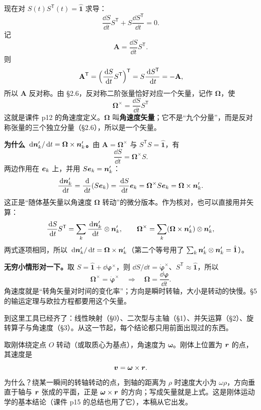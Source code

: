 \documentclass[11pt]{ctexart}
\newcommand{\ten}[1]{\mathbf{#1}}
\newcommand{\unitd}{\hat{\ten{1}}}
\let\orighdr\hdr
\renewcommand{\hdr}[2]{\par\needspace{5\baselineskip}\orighdr{#1}{#2}}
\let\origsubhdr\subhdr
\renewcommand{\subhdr}[1]{\par\needspace{3\baselineskip}\origsubhdr{#1}}
\begin{document}
现在对 $S(t)S^{\mathsf T}(t)=\unitd$ 求导：
\[
\frac{\dd S}{\dd t}S^{\mathsf T}+S\frac{\dd S^{\mathsf T}}{\dd t}=0 .
\]
记
\[
\ten A=\frac{\dd S}{\dd t}S^{\mathsf T}.
\]
则
\[
\ten A^{\mathsf T}=\Bigl(\frac{\dd S}{\dd t}S^{\mathsf T}\Bigr)^{\mathsf T}
=S\frac{\dd S^{\mathsf T}}{\dd t}=-\ten A,
\]
所以 $\ten A$ 反对称。由 §2.6，反对称二阶张量恰好对应一个矢量，记作 $\boldsymbol\Omega$，使
\[
\boxed{\;\boldsymbol\Omega^{\times}=\frac{\dd S}{\dd t}S^{\mathsf T}\;}
\]
这就是课件 p12 的角速度定义。$\boldsymbol\Omega$ 叫\textbf{角速度矢量}；它不是“九个分量”，而是反对称张量的三个独立分量（§2.6），所以是一个矢量。

\textbf{为什么 $\,\mathrm{d}\boldsymbol{n}'_k/\,\mathrm{d} t=\boldsymbol\Omega\times\boldsymbol{n}'_k$。}由 $\ten A=\boldsymbol\Omega^{\times}$ 与 $S^{\mathsf T}S=\unitd$，有
\[
\frac{\dd S}{\dd t}=\boldsymbol\Omega^{\times}S .
\]
两边作用在 $\boldsymbol{e}_k$ 上，并用 $S\boldsymbol{e}_k=\boldsymbol{n}'_k$：
\[
\frac{\,\mathrm{d}\boldsymbol{n}'_k}{\,\mathrm{d} t}=\frac{\,\mathrm{d}}{\,\mathrm{d} t}(S\boldsymbol{e}_k)=\frac{\,\mathrm{d} S}{\,\mathrm{d} t}\boldsymbol{e}_k=\boldsymbol\Omega^{\times}S\boldsymbol{e}_k=\boldsymbol\Omega\times\boldsymbol{n}'_k .
\]
这正是“随体基矢量以角速度 $\boldsymbol\Omega$ 转动”的微分版本。作为核对，也可以直接用并矢算：
\[
\frac{\,\mathrm{d} S}{\,\mathrm{d} t}S^{\mathsf T}
=\sum_k\frac{\,\mathrm{d}\boldsymbol{n}'_k}{\,\mathrm{d} t}\otimes\boldsymbol{n}'_k,
\qquad
\boldsymbol\Omega^{\times}=\sum_k(\boldsymbol\Omega\times\boldsymbol{n}'_k)\otimes\boldsymbol{n}'_k,
\]
两式逐项相同，所以 $\,\mathrm{d}\boldsymbol{n}'_k/\,\mathrm{d} t=\boldsymbol\Omega\times\boldsymbol{n}'_k$（第二个等号用了 $\sum_k\vect n'_k\otimes\vect n'_k=\unitd$）。

\textbf{无穷小情形对一下。}取 $S=\unitd+\dd{\boldsymbol\varphi}^{\times}$，则 $\dd S/\dd t=\dot{\boldsymbol\varphi}^{\times}$、$S^{\mathsf T}\approx\unitd$，所以
\[
\boldsymbol\Omega^{\times}=\dot{\boldsymbol\varphi}^{\times}
\quad\Longrightarrow\quad
\boldsymbol\Omega=\frac{\dd{\boldsymbol\varphi}}{\dd t}.
\]
角速度就是“转角矢量对时间的变化率”；方向是瞬时转轴，大小是转动的快慢。§5 的输运定理与欧拉方程都要用这个矢量。


到这里工具已经齐了：线性映射（§0）、二次型与主轴（§1）、并矢运算（§2）、旋转算子与角速度（§3）。从这一节起，每个结论都只用前面出现过的东西。


取刚体绕定点 $O$ 转动（或取质心为基点），角速度为 $\boldsymbol\omega$。刚体上位置为 $\boldsymbol{r}$ 的点，其速度是
\[
\boldsymbol{v}=\boldsymbol\omega\times\boldsymbol{r} .
\]
为什么？绕某一瞬间的转轴转动的点，到轴的距离为 $\rho$ 时速度大小为 $\omega\rho$，方向垂直于轴与 $\boldsymbol{r}$ 张成的平面，正是 $\boldsymbol\omega\times\boldsymbol{r}$ 的方向；写成矢量就是上式。这是刚体运动学的基本结论（课件 p15 的总结也用了它），本稿从它出发。
\end{document}
